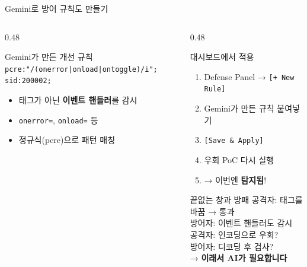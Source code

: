 \documentclass[aspectratio=169,10pt]{beamer}
\newcommand{\hlt}[1]{\textcolor{accent}{\textbf{#1}}}
\begin{document}
\begin{frame}[shrink=3]{Gemini로 방어 규칙도 만들기}
\vspace{0.3em}
\begin{columns}[T]
\begin{column}{0.48\textwidth}
\begin{block}{Gemini가 만든 개선 규칙}
{\scriptsize
\texttt{pcre:"/(onerror|onload|ontoggle)/i";}\\
\texttt{sid:200002;}
}
\vspace{0.2em}
\begin{itemize}
    \item 태그가 아닌 \hlt{이벤트 핸들러}를 감시
    \item \texttt{onerror=}, \texttt{onload=} 등
    \item 정규식(pcre)으로 패턴 매칭
\end{itemize}
\end{block}
\end{column}
\begin{column}{0.48\textwidth}
\begin{block}{대시보드에서 적용}
\begin{enumerate}
    \item Defense Panel → \texttt{[+ New Rule]}
    \item Gemini가 만든 규칙 붙여넣기
    \item \texttt{[Save \& Apply]}
    \item 우회 PoC 다시 실행
    \item → 이번엔 \hlt{탐지됨}!
\end{enumerate}
\end{block}
\vspace{0.2em}
\begin{alertblock}{끝없는 창과 방패}
공격자: 태그를 바꿈 → 통과\\
방어자: 이벤트 핸들러도 감시\\
공격자: 인코딩으로 우회?\\
방어자: 디코딩 후 검사?\\
→ \hlt{이래서 AI가 필요합니다}
\end{alertblock}
\end{column}
\end{columns}
\end{frame}
\end{document}
